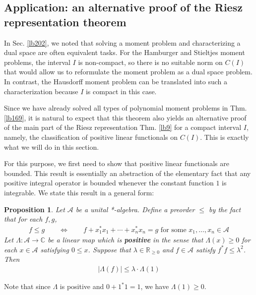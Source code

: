 \documentclass[12pt,b5paper,notitlepage]{article}
\theoremstyle{definition}
\theoremstyle{plain}
\newtheorem{pp}[df]{Proposition}
\newcommand{\scr}{\mathscr}
\newcommand{\Cbb}{\mathbb C}
\newcommand{\Rbb}{\mathbb R}
\numberwithin{equation}{section}
\begin{document}
\subsection{Application: an alternative proof of the Riesz representation theorem}


In Sec. \ref{lb202}, we noted that solving a moment problem and characterizing a dual space are often equivalent tasks. For the Hamburger and Stieltjes moment problems, the interval $I$ is non-compact, so there is no suitable norm on $C(I)$ that would allow us to reformulate the moment problem as a dual space problem. In contrast, the Hausdorff moment problem can be translated into such a characterization because $I$ is compact in this case.

Since we have already solved all types of polynomial moment problems in Thm. \ref{lb169}, it is natural to expect that this theorem also yields an alternative proof of the main part of the Riesz representation Thm. \ref{lb9} for a compact interval
$I$, namely, the classification of positive linear functionals on 
$C(I)$. This is exactly what we will do in this section.

For this purpose, we first need to show that positive linear functionals are bounded. This result is essentially an abstraction of the elementary fact that any positive integral operator is bounded whenever the constant function $1$ is integrable. We state this result in a general form:



\begin{pp}\label{lb204}
Let $\scr A$ be a unital *-algebra. Define a preorder $\leq$ by the fact that for each $f,g$,
\begin{align*}
f\leq g\qquad\Longleftrightarrow \qquad f+x_1^*x_1+\cdots+x_n^*x_n=g\text{ for some }x_1,\dots,x_n\in\scr A
\end{align*}
Let $\Lambda:\scr A\rightarrow\Cbb$ be a linear map which is \textbf{positive} in the sense that $\Lambda(x)\geq0$ for each $x\in\scr A$ satisfying $0\leq x$. Suppose that $\lambda\in\Rbb_{\geq0}$ and $f\in\scr A$ satisfy $f^*f\leq\lambda^2$. Then
\begin{align}\label{eq118}
|\Lambda(f)|\leq\lambda\cdot\Lambda(1)
\end{align} 
\end{pp}

Note that since $\Lambda$ is positive and $0+1^*1=1$, we have $\Lambda(1)\geq0$.
\end{document}
